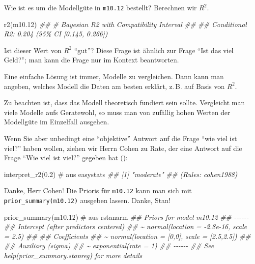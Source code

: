 \documentclass[
  ngerman,
  letterpaper,
  twoside,
  open=any]{scrbook}
\newenvironment{Shaded}{\begin{snugshade}}{\end{snugshade}}
\newcommand{\CommentTok}[1]{\textcolor[rgb]{0.37,0.37,0.37}{#1}}
\newcommand{\DocumentationTok}[1]{\textcolor[rgb]{0.37,0.37,0.37}{\textit{#1}}}
\newcommand{\FloatTok}[1]{\textcolor[rgb]{0.68,0.00,0.00}{#1}}
\newcommand{\FunctionTok}[1]{\textcolor[rgb]{0.28,0.35,0.67}{#1}}
\newcommand{\NormalTok}[1]{\textcolor[rgb]{0.00,0.23,0.31}{#1}}
\theoremstyle{definition}
\theoremstyle{plain}
\theoremstyle{definition}
\theoremstyle{definition}
\theoremstyle{definition}
\theoremstyle{definition}
\theoremstyle{remark}
\begin{document}
Wie ist es um die Modellgüte in \texttt{m10.12} bestellt? Berechnen wir
\(R^2\).

\begin{Shaded}
\begin{Highlighting}[]
\FunctionTok{r2}\NormalTok{(m10}\FloatTok{.12}\NormalTok{)}
\DocumentationTok{\#\# \# Bayesian R2 with Compatibility Interval}
\DocumentationTok{\#\# }
\DocumentationTok{\#\#   Conditional R2: 0.204 (95\% CI [0.145, 0.266])}
\end{Highlighting}
\end{Shaded}

Ist dieser Wert von \(R^2\) \enquote{gut}? Diese Frage ist ähnlich zur
Frage \enquote{Ist das viel Geld?}; man kann die Frage nur im Kontext
beantworten.

Eine einfache Lösung ist immer, Modelle zu vergleichen. Dann kann man
angeben, welches Modell die Daten am besten erklärt, z.\,B. auf Basis
von \(R^2\).

Zu beachten ist, dass das Modell theoretisch fundiert sein sollte.
Vergleicht man viele Modelle aufs Geratewohl, so muss man von zufällig
hohen Werten der Modellgüte im Einzelfall ausgehen.

Wenn Sie aber unbedingt eine \enquote{objektive} Antwort auf die Frage
\enquote{wie viel ist viel?} haben wollen, ziehen wir Herrn Cohen zu
Rate, der eine Antwort auf die Frage \enquote{Wie viel ist viel?}
gegeben hat ():

\begin{Shaded}
\begin{Highlighting}[]
\FunctionTok{interpret\_r2}\NormalTok{(}\FloatTok{0.2}\NormalTok{)  }\CommentTok{\# aus \textasciigrave{}easystats\textasciigrave{}}
\DocumentationTok{\#\# [1] "moderate"}
\DocumentationTok{\#\# (Rules: cohen1988)}
\end{Highlighting}
\end{Shaded}

Danke, Herr Cohen! Die Prioris für \texttt{m10.12} kann man sich mit
\texttt{prior\_summary(m10.12)} ausgeben lassen. Danke, Stan!

\begin{Shaded}
\begin{Highlighting}[]
\FunctionTok{prior\_summary}\NormalTok{(m10}\FloatTok{.12}\NormalTok{)  }\CommentTok{\# aus rstanarm}
\DocumentationTok{\#\# Priors for model \textquotesingle{}m10.12\textquotesingle{} }
\DocumentationTok{\#\# {-}{-}{-}{-}{-}{-}}
\DocumentationTok{\#\# Intercept (after predictors centered)}
\DocumentationTok{\#\#  \textasciitilde{} normal(location = {-}2.8e{-}16, scale = 2.5)}
\DocumentationTok{\#\# }
\DocumentationTok{\#\# Coefficients}
\DocumentationTok{\#\#  \textasciitilde{} normal(location = [0,0], scale = [2.5,2.5])}
\DocumentationTok{\#\# }
\DocumentationTok{\#\# Auxiliary (sigma)}
\DocumentationTok{\#\#  \textasciitilde{} exponential(rate = 1)}
\DocumentationTok{\#\# {-}{-}{-}{-}{-}{-}}
\DocumentationTok{\#\# See help(\textquotesingle{}prior\_summary.stanreg\textquotesingle{}) for more details}
\end{Highlighting}
\end{Shaded}
\end{document}

